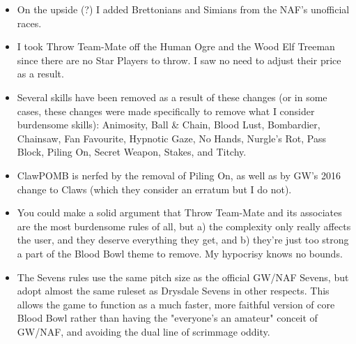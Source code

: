 \begin{multicols}{2}
\begin{itemize}
\item On the upside (?) I added Brettonians and Simians from the NAF's unofficial races.
\item I took Throw Team-Mate off the Human Ogre and the Wood Elf Treeman since there are no Star Players to throw. I saw no need to adjust their price as a result.
\item Several skills have been removed as a result of these changes (or in some cases, these changes were made specifically to remove what I consider burdensome skills): Animosity, Ball \& Chain, Blood Lust, Bombardier, Chainsaw, Fan Favourite, Hypnotic Gaze, No Hands, Nurgle's Rot, Pass Block, Piling On, Secret Weapon, Stakes, and Titchy.
\item ClawPOMB is nerfed by the removal of Piling On, as well as by GW's 2016 change to Claws (which they consider an erratum but I do not).
\item You could make a solid argument that Throw Team-Mate and its associates are the most burdensome rules of all, but a) the complexity only really affects the user, and they deserve everything they get, and b) they're just too strong a part of the Blood Bowl theme to remove. My hypocrisy knows no bounds.
\item The Sevens rules use the same pitch size as the official GW/NAF Sevens, but adopt almost the same ruleset as Drysdale Sevens in other respects. This allows the game to function as a much faster, more faithful version of core Blood Bowl rather than having the "everyone's an amateur" conceit of GW/NAF, and avoiding the dual line of scrimmage oddity.
\end{itemize}

\end{multicols}
